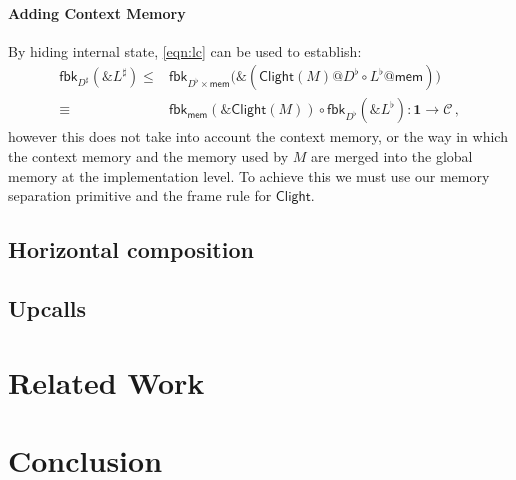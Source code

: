 \documentclass[acmsmall,screen,review,anonymous]{acmart}
\newcommand{\kw}[1]{\ensuremath{ \mathsf{#1} }}
\begin{document}
\paragraph{Adding Context Memory}

By hiding internal state,
\autoref{eqn:lc} can be used to establish:
\begin{align*}
  \kw{fbk}_{D^\sharp}(\&L^\sharp) \le {} &
  \kw{fbk}_{D^\flat \times \kw{mem}} \big(
    \&(\kw{Clight}(M)@D^\flat \circ L^\flat@\kw{mem})
    \big) \\ \equiv {} &
  \kw{fbk}_\kw{mem}(\&\kw{Clight}(M)) \circ \kw{fbk}_{D^\flat}(\&L^\flat)
  : \mathbf{1} \rightarrow \mathcal{C}
  \,,
\end{align*}
however this does not take into account the context memory,
or the way in which the context memory and the memory used by $M$
are merged into the global memory
at the implementation level.
To achieve this we must use our memory separation primitive
and the frame rule for $\kw{Clight}$.



\subsection{Horizontal composition} %


\subsection{Upcalls} %



\section{Related Work}

\section{Conclusion}


\end{document}
